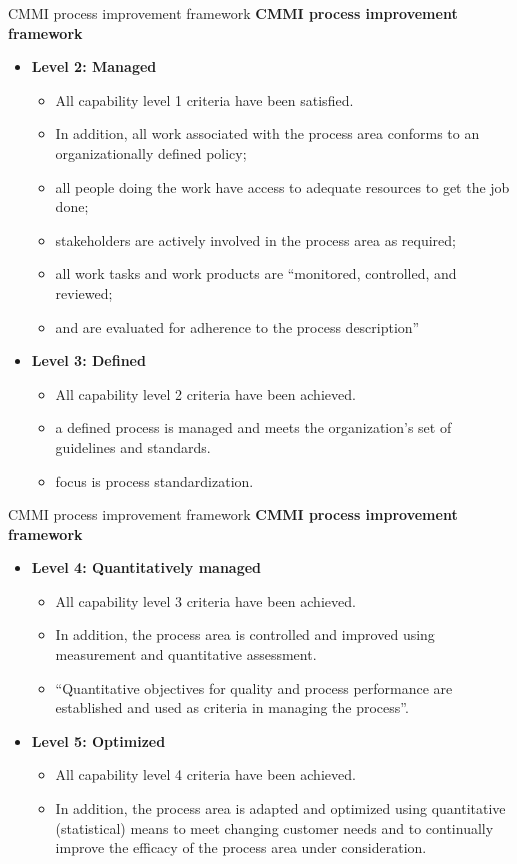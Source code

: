 \documentclass{beamer}
\begin{document}
\begin{frame}{CMMI process improvement framework}
	\textbf{CMMI process improvement framework}
	\begin{itemize}
		\item \textbf{Level 2: Managed} 
		\begin{itemize}
			\item All capability level 1 criteria have been satisfied.
			\item In addition, all work associated with the process area conforms to an organizationally defined policy;
			\item all people doing the work have access to adequate resources to get the job done;
			\item stakeholders are actively involved in the process area as required; 
			\item all work tasks and work products are “monitored, controlled, and reviewed;
			\item and are evaluated for adherence to the process description” 
		\end{itemize}
		\item \textbf{Level 3: Defined}
		\begin{itemize}
			\item All capability level 2 criteria have been achieved.
			\item a defined process is managed and meets the organization’s set of guidelines and standards.
			\item focus is process standardization.
			
		\end{itemize} 
	\end{itemize}
\end{frame}
\begin{frame}{CMMI process improvement framework}
	\textbf{CMMI process improvement framework}
	\begin{itemize}
		\item \textbf{Level 4: Quantitatively managed } 
		\begin{itemize}
			\item All capability level 3 criteria have been achieved.
			\item In addition, the process area is controlled and improved using measurement and quantitative assessment.
			\item “Quantitative objectives for quality and process performance are established and used as criteria in managing the process”. 
		\end{itemize}
		\item \textbf{Level 5: Optimized }
		\begin{itemize}
			\item All capability level 4 criteria have been achieved.
			\item In addition, the process area is adapted and optimized using quantitative (statistical) means to meet changing customer needs and to continually improve the efficacy of the process area under consideration.
		\end{itemize} 
	\end{itemize}
\end{frame}
\end{document}
